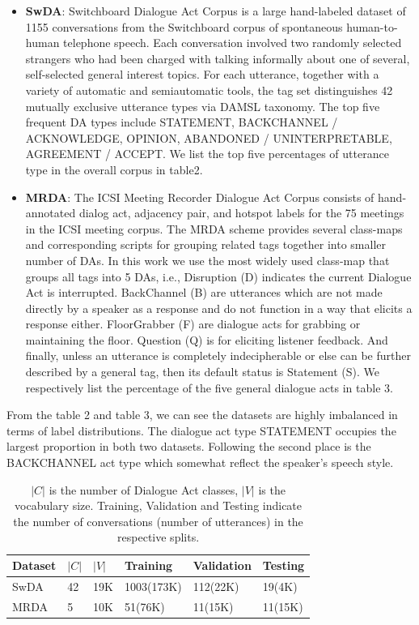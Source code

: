 \documentclass[sigconf]{acmart}
\begin{document}
\begin{itemize}
\item \textbf{SwDA}: Switchboard Dialogue Act Corpus is a large hand-labeled dataset of 1155 conversations from the Switchboard corpus of spontaneous human-to-human
telephone speech. Each conversation involved two randomly selected strangers
who had been charged with talking informally about one of several, self-selected general interest topics. For each utterance, together with a variety of automatic and semiautomatic tools, the tag set distinguishes 42 mutually
exclusive utterance types via DAMSL taxonomy. The top five frequent DA types include STATEMENT, BACKCHANNEL / ACKNOWLEDGE, OPINION, ABANDONED / UNINTERPRETABLE, AGREEMENT / ACCEPT. We list the top five percentages of utterance type in the overall corpus in table2.

\item \textbf{MRDA}: The ICSI Meeting Recorder Dialogue Act Corpus consists of hand-annotated dialog act, adjacency pair, and hotspot labels for the 75 meetings in the ICSI meeting corpus. The MRDA scheme provides several class-maps and corresponding scripts for grouping related tags together into smaller number of DAs. In this work we use the most widely used class-map that groups all tags into 5 DAs, i.e., Disruption (D) indicates the current Dialogue Act is interrupted. BackChannel (B) are utterances which are not made directly by a speaker as a response and do not function in a way that elicits a response either. FloorGrabber (F) are dialogue acts for grabbing or maintaining the floor. Question (Q) is for eliciting listener feedback. And finally, unless an utterance is completely indecipherable or else can be further described by a general tag, then its default status is Statement (S). We respectively list the percentage of the five general dialogue acts in table 3.
\end{itemize} 

From the table 2 and table 3, we can see the datasets are highly imbalanced in terms of label distributions. The dialogue act type STATEMENT occupies the largest proportion in both two datasets. Following the second place is the BACKCHANNEL act type which somewhat reflect the speaker's speech style.  

\begin{table}[t]
	\small
	\begin{tabular}{|p{0.9cm}|p{0.3cm}|p{0.5cm}|l|l|l|}
		\hline
		Dataset & $|C|$ & $|V|$ & Training 	& Validation & Testing	\\\hline
		SwDA	& 42	& 19K	& 1003(173K)& 112(22K)	 & 19(4K) 	\\
		MRDA	& 5		& 10K	& 51(76K)	& 11(15K)	 & 11(15K) 	\\
		\hline
	\end{tabular}
	\caption{$|C|$ is the number of Dialogue Act classes, $|V|$ is the vocabulary size. Training, Validation and Testing indicate the number of conversations (number of utterances) in the respective splits.}
	\label{table:datastats}
\end{table}
\end{document}
